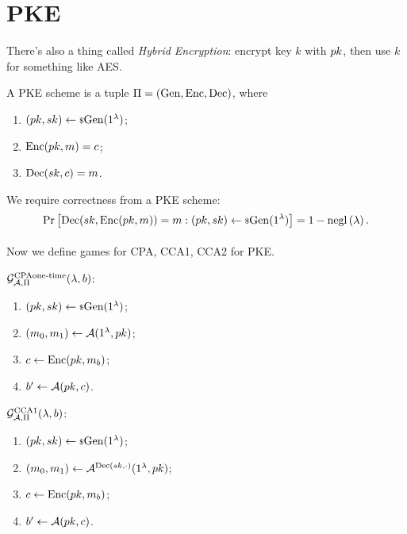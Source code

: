 
\section{\acl{PKE}}


There's also a thing called \emph{Hybrid Encryption}: encrypt key $k$ with $pk$, then use $k$ for something like \ac{AES}.

\begin{definition}
	A \ac{PKE} scheme is a tuple $\Pi = \left( \mathrm{Gen} , \allowbreak \mathrm{Enc} , \allowbreak \mathrm{Dec} \right)$, where
	\begin{enumerate}
		\item $(pk, sk) \leftarrow {\scriptstyle \$} {\mathrm{Gen}(1^{\lambda})}$;
		\item $\mathrm{Enc}(pk, m) = c$;
		\item $\mathrm{Dec}(sk, c) = m$. \qedhere
	\end{enumerate}
\end{definition}
We require correctness from a \ac{PKE} scheme:
\begin{equation*}
	\mathop{\mathrm{Pr}}\limits_{} \left[ {
		\mathrm{Dec}(sk, \mathrm{Enc}(pk, m)) = m : (pk, sk) \leftarrow {\scriptstyle \$} {\mathrm{Gen}(1^{\lambda})}
	} \right]
	= 1 - \mathrm{negl}\left({\lambda}\right).
\end{equation*}

Now we define games for \ac{CPA}, \ac{CCA}1, \ac{CCA}2 for \ac{PKE}.

\begin{definition}
	$\mathcal{G}_{\mathcal{A}, \Pi}^{\text{CPA \\ one-time}}(\lambda, b)$:
	\begin{enumerate}
		\item $(pk, sk) \leftarrow {\scriptstyle \$} {\mathrm{Gen}(1^{\lambda})}$;
		\item $(m_0, m_1) \leftarrow \mathcal{A}(1^{\lambda}, pk)$;
		\item $c \leftarrow \mathrm{Enc}(pk, m_b)$;
		\item $b' \leftarrow \mathcal{A}(pk, c)$. \qedhere
	\end{enumerate}
\end{definition}

\begin{definition}
	$\mathcal{G}_{\mathcal{A}, \Pi}^{\text{CCA{1}}}(\lambda, b)$:
	\begin{enumerate}
		\item $(pk, sk) \leftarrow {\scriptstyle \$} {\mathrm{Gen}(1^{\lambda})}$;
		\item $(m_0, m_1) \leftarrow \mathcal{A}^{\mathrm{Dec}(sk, \cdot)}(1^{\lambda}, pk)$;
		\item $c \leftarrow \mathrm{Enc}(pk, m_b)$;
		\item $b' \leftarrow \mathcal{A}(pk, c)$. \qedhere
	\end{enumerate}
\end{definition}

